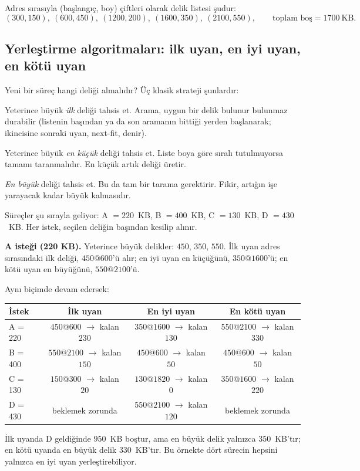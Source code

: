 Adres sırasıyla (başlangıç, boy) çiftleri olarak delik listesi şudur:
\[
(300,150),\ (600,450),\ (1200,200),\ (1600,350),\ (2100,550),\qquad \text{toplam boş} = 1700\ \text{KB}.
\]

\subsection{Yerleştirme algoritmaları: ilk uyan, en iyi uyan, en kötü uyan}

Yeni bir süreç hangi deliği almalıdır? Üç klasik strateji şunlardır:
\begin{description}[leftmargin=0pt,style=nextline,itemsep=0.3em]
  \item[İlk uyan (first-fit)] Yeterince büyük \emph{ilk} deliği tahsis et. Arama, uygun bir delik bulunur bulunmaz durabilir (listenin başından ya da son aramanın bittiği yerden başlanarak; ikincisine sonraki uyan, next-fit, denir).
  \item[En iyi uyan (best-fit)] Yeterince büyük \emph{en küçük} deliği tahsis et. Liste boya göre sıralı tutulmuyorsa tamamı taranmalıdır. En küçük artık deliği üretir.
  \item[En kötü uyan (worst-fit)] \emph{En büyük} deliği tahsis et. Bu da tam bir tarama gerektirir. Fikir, artığın işe yarayacak kadar büyük kalmasıdır.
\end{description}

\begin{example}
Süreçler şu sırayla geliyor: A $=220$~KB, B $=400$~KB, C $=130$~KB, D $=430$~KB. Her istek, seçilen deliğin başından kesilip alınır.

\textbf{A isteği (220 KB).} Yeterince büyük delikler: $450$, $350$, $550$. İlk uyan adres sırasındaki ilk deliği, $450@600$'ü alır; en iyi uyan en küçüğünü, $350@1600$'ü; en kötü uyan en büyüğünü, $550@2100$'ü.

Aynı biçimde devam edersek:
\begin{center}
\renewcommand{\arraystretch}{1.25}
\begin{tabular}{@{}lccc@{}}
\toprule
\textbf{İstek} & \textbf{İlk uyan} & \textbf{En iyi uyan} & \textbf{En kötü uyan} \\
\midrule
A = 220 & $450@600$ $\to$ kalan $230$ & $350@1600$ $\to$ kalan $130$ & $550@2100$ $\to$ kalan $330$ \\
B = 400 & $550@2100$ $\to$ kalan $150$ & $450@600$ $\to$ kalan $50$ & $450@600$ $\to$ kalan $50$ \\
C = 130 & $150@300$ $\to$ kalan $20$ & $130@1820$ $\to$ kalan $0$ & $350@1600$ $\to$ kalan $220$ \\
D = 430 & \textcolor{red!60!black}{beklemek zorunda} & $550@2100$ $\to$ kalan $120$ & \textcolor{red!60!black}{beklemek zorunda} \\
\bottomrule
\end{tabular}
\end{center}
İlk uyanda D geldiğinde $950$~KB boştur, ama en büyük delik yalnızca $350$~KB'tır; en kötü uyanda en büyük delik $330$~KB'tır. Bu örnekte dört sürecin hepsini yalnızca en iyi uyan yerleştirebiliyor.
\end{example}

